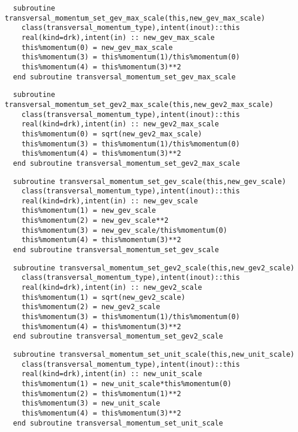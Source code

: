 \begin{Verbatim}
  subroutine transversal_momentum_set_gev_max_scale(this,new_gev_max_scale)
    class(transversal_momentum_type),intent(inout)::this
    real(kind=drk),intent(in) :: new_gev_max_scale
    this%momentum(0) = new_gev_max_scale
    this%momentum(3) = this%momentum(1)/this%momentum(0)
    this%momentum(4) = this%momentum(3)**2
  end subroutine transversal_momentum_set_gev_max_scale
\end{Verbatim}

\begin{Verbatim}
  subroutine transversal_momentum_set_gev2_max_scale(this,new_gev2_max_scale)
    class(transversal_momentum_type),intent(inout)::this
    real(kind=drk),intent(in) :: new_gev2_max_scale
    this%momentum(0) = sqrt(new_gev2_max_scale)
    this%momentum(3) = this%momentum(1)/this%momentum(0)
    this%momentum(4) = this%momentum(3)**2
  end subroutine transversal_momentum_set_gev2_max_scale
\end{Verbatim}

\begin{Verbatim}
  subroutine transversal_momentum_set_gev_scale(this,new_gev_scale)
    class(transversal_momentum_type),intent(inout)::this
    real(kind=drk),intent(in) :: new_gev_scale
    this%momentum(1) = new_gev_scale
    this%momentum(2) = new_gev_scale**2
    this%momentum(3) = new_gev_scale/this%momentum(0)
    this%momentum(4) = this%momentum(3)**2
  end subroutine transversal_momentum_set_gev_scale
\end{Verbatim}

\begin{Verbatim}
  subroutine transversal_momentum_set_gev2_scale(this,new_gev2_scale)
    class(transversal_momentum_type),intent(inout)::this
    real(kind=drk),intent(in) :: new_gev2_scale
    this%momentum(1) = sqrt(new_gev2_scale)
    this%momentum(2) = new_gev2_scale
    this%momentum(3) = this%momentum(1)/this%momentum(0)
    this%momentum(4) = this%momentum(3)**2
  end subroutine transversal_momentum_set_gev2_scale
\end{Verbatim}

\begin{Verbatim}
  subroutine transversal_momentum_set_unit_scale(this,new_unit_scale)
    class(transversal_momentum_type),intent(inout)::this
    real(kind=drk),intent(in) :: new_unit_scale
    this%momentum(1) = new_unit_scale*this%momentum(0)
    this%momentum(2) = this%momentum(1)**2
    this%momentum(3) = new_unit_scale
    this%momentum(4) = this%momentum(3)**2
  end subroutine transversal_momentum_set_unit_scale
\end{Verbatim}

